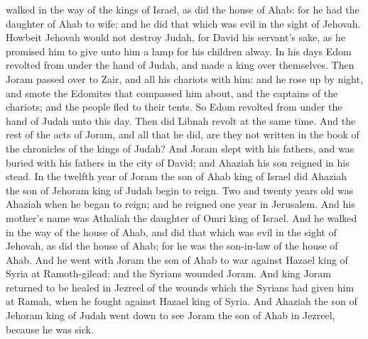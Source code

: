 walked in the way of the kings of Israel, as did the house of Ahab: for he had the daughter of Ahab to wife; and he did that which was evil in the sight of Jehovah. Howbeit Jehovah would not destroy Judah, for David his servant’s sake, as he promised him to give unto him a lamp for his children alway.  In his days Edom revolted from under the hand of Judah, and made a king over themselves. Then Joram passed over to Zair, and all his chariots with him: and he rose up by night, and smote the Edomites that compassed him about, and the captains of the chariots; and the people fled to their tents. So Edom revolted from under the hand of Judah unto this day. Then did Libnah revolt at the same time. And the rest of the acts of Joram, and all that he did, are they not written in the book of the chronicles of the kings of Judah? And Joram slept with his fathers, and was buried with his fathers in the city of David; and Ahaziah his son reigned in his stead.  In the twelfth year of Joram the son of Ahab king of Israel did Ahaziah the son of Jehoram king of Judah begin to reign. Two and twenty years old was Ahaziah when he began to reign; and he reigned one year in Jerusalem. And his mother’s name was Athaliah the daughter of Omri king of Israel. And he walked in the way of the house of Ahab, and did that which was evil in the sight of Jehovah, as did the house of Ahab; for he was the son-in-law of the house of Ahab. And he went with Joram the son of Ahab to war against Hazael king of Syria at Ramoth-gilead: and the Syrians wounded Joram. And king Joram returned to be healed in Jezreel of the wounds which the Syrians had given him at Ramah, when he fought against Hazael king of Syria. And Ahaziah the son of Jehoram king of Judah went down to see Joram the son of Ahab in Jezreel, because he was sick. 

